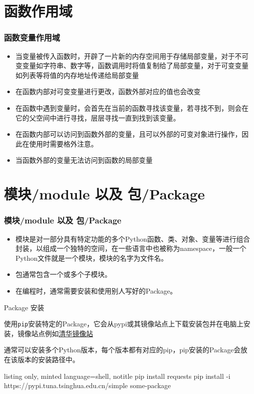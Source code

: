 \documentclass[10pt]{beamer}
\begin{document}
\section{函数作用域}

\begin{frame}
    \frametitle{函数变量作用域}

    \begin{itemize}
        \item 当变量被传入函数时，开辟了一片新的内存空间用于存储局部变量，对于不可变变量如字符串、数字等，函数调用时将值复制给了局部变量，对于可变变量如列表等将值的内存地址传递给局部变量
        \item 在函数内部对可变变量进行更改，函数外部对应的值也会改变
        \item 在函数中遇到变量时，会首先在当前的函数寻找该变量，若寻找不到，则会在它的父空间中进行寻找，层层寻找一直到找到该变量。
        \item 在函数内部可以访问到函数外部的变量，且可以外部的可变对象进行操作，因此在使用时需要格外注意。
        \item 当函数外部的变量无法访问到函数的局部变量
    \end{itemize}

\end{frame}


\section{模块/module 以及 包/Package}
\begin{frame}[fragile]
    \frametitle{模块/module 以及 包/Package}


    \begin{itemize}
        \item 模块是对一部分具有特定功能的多个Python函数、类、对象、变量等进行组合封装，以组成一个独特的空间，在一些语言中也被称为namespace，一般一个Python文件就是一个模块，模块的名字为文件名。
        \item 包通常包含一个或多个子模块。
        \item 在编程时，通常需要安装和使用别人写好的Package。
    \end{itemize}

    \begin{block}{Package 安装}

        使用\texttt{pip}安装特定的Package，它会从pypi或其镜像站点上下载安装包并在电脑上安装，镜像站点例如\href{https://mirrors.tuna.tsinghua.edu.cn/help/pypi/}{清华镜像站}
    
    通常可以安装多个Python版本，每个版本都有对应的pip，pip安装的Package会放在该版本的安装路径中。

    \begin{tcblisting}{listing only, minted language=shell, notitle}
        pip install requests
        pip install -i https://pypi.tuna.tsinghua.edu.cn/simple some-package\end{tcblisting}
        
    \end{block}


\end{frame}
\end{document}

